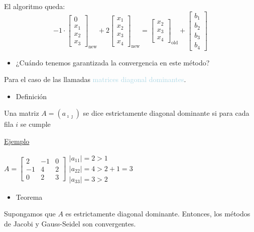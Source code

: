 \documentclass[12pt]{article}
\begin{document}
El algoritmo queda: 
\[-1\cdot\begin{bmatrix}
0 \\ 
x_1 \\ 
x_2 \\ 
x_3
\end{bmatrix}_{\mathrm{new}}+2\begin{bmatrix}
x_1 \\ 
x_2 \\ 
x_3 \\ 
x_4
\end{bmatrix}_{\mathrm{new}}=\begin{bmatrix}
x_2 \\ 
x_3 \\ 
x_4
\end{bmatrix}_{\mathrm{old}}+\begin{bmatrix}
b_1 \\ 
b_2 \\ 
b_3 \\ 
b_4
\end{bmatrix} \]
\begin{itemize}[label=\color{red}\textbullet, leftmargin=*]
    \item \color{lightblue} ¿Cuándo tenemos garantizada la convergencia en este método?
\end{itemize}
Para el caso de las llamadas \textcolor{lightblue}{matrices diagonal dominantes}.
\begin{itemize}[label=\color{red}\textbullet, leftmargin=*]
    \item \color{lightblue} Definición
\end{itemize}
Una matriz $A=(a_{\imath\jmath  })$ se dice estrictamente diagonal dominante si para cada fila $i$ se cumple\begin{center}
\end{center}
\underline{Ejemplo}

$A=\begin{bmatrix}
2 & -1 & 0 \\ 
-1 & 4 & 2 \\ 
0 & 2 & 3
\end{bmatrix}\begin{array}{l}
|a_{11}|=2>1\\
|a_{22}|=4>2+1=3\\
|a_{33}|=3>2
\end{array}$
\begin{itemize}[label=\color{red}\textbullet, leftmargin=*]
    \item \color{lightblue}Teorema
\end{itemize}
Supongamos que $A$ es estrictamente diagonal dominante. Entonces, los métodos de Jacobi y Gauss-Seidel son convergentes.
\end{document}
